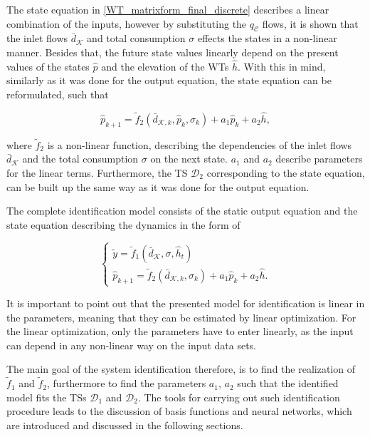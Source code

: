 The state equation in \eqref{WT_matrixform_final_discrete} describes a linear combination of the inputs, however by substituting the $q_\mathcal{C}$ flows, it is shown that the inlet flows $\bar{d}_{\mathcal{K}}$ and total consumption $\sigma$ effects the states in a non-linear manner. Besides that, the future state values linearly depend on the present values of the states $\hat{p}$ and the elevation of the WTs $\hat{h}$. With this in mind, similarly as it was done for the output equation, the state equation can be reformulated, such that 

\begin{equation}
\label{WT_matrixform_final_discrete2}
\hat{p}_{k+1} = \tilde{f}_2(\bar{d}_{\mathcal{K},k}, \hat{p}_k, \sigma_k) + a_1 \hat{p}_k + a_2 \hat{h},
\end{equation}

where $\tilde{f}_2$ is a non-linear function, describing the dependencies of the inlet flows $\bar{d}_{\mathcal{K}}$ and the total consumption $\sigma$ on the next state. $a_1$ and $a_2$ describe parameters for the linear terms. Furthermore, the TS $\mathcal{D}_2$ corresponding to the state equation, can be built up the same way as it was done for the output equation. 

The complete identification model consists of the static output equation and the state equation describing the dynamics in the form of

\begin{equation}
\begin{cases}
  \label{identification_model}
    \tilde{y}  = \tilde{f}_1(\bar{d}_{\mathcal{K}}, \sigma, \hat{h}_t )\\
  \hat{p}_{k+1} = \tilde{f}_2(\bar{d}_{\mathcal{K},k}, \sigma_k) + a_1 \hat{p}_k + a_2 \hat{h} .
  \end{cases}
\end{equation} 

It is important to point out that the presented model for identification is linear in the parameters, meaning that they can be estimated by linear optimization. For the linear optimization, only the parameters have to enter linearly, as the input can depend in any non-linear way on the input data sets. 

The main goal of the system identification therefore, is to find the realization of $\tilde{f}_1$ and $\tilde{f}_2$, furthermore to find the parameters $a_1$, $a_2$ such that the identified model fits the TSs $\mathcal{D}_{1}$ and $\mathcal{D}_{2}$. The tools for carrying out such identification procedure leads to the discussion of basis functions and neural networks, which are introduced and discussed in the following sections.   

